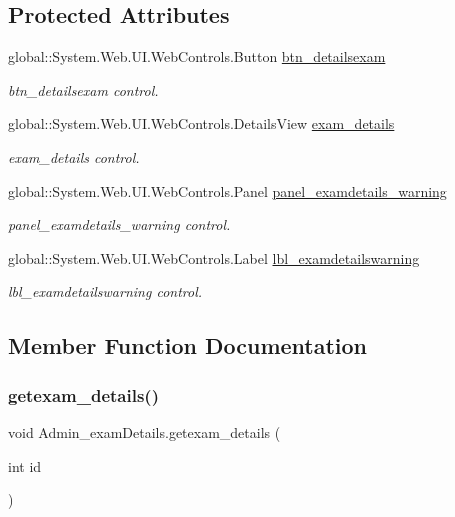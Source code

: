 \subsection*{Protected Attributes}
\begin{DoxyCompactItemize}
\item 
global\+::\+System.\+Web.\+U\+I.\+Web\+Controls.\+Button \mbox{\hyperlink{class_admin__exam_details_a3599c2b50cf49795d72693d1bfda6c34}{btn\+\_\+detailsexam}}
\begin{DoxyCompactList}\small\item\em btn\+\_\+detailsexam control. \end{DoxyCompactList}\item 
global\+::\+System.\+Web.\+U\+I.\+Web\+Controls.\+Details\+View \mbox{\hyperlink{class_admin__exam_details_afdfbbd6b753e1569ba22d7bc302a15a1}{exam\+\_\+details}}
\begin{DoxyCompactList}\small\item\em exam\+\_\+details control. \end{DoxyCompactList}\item 
global\+::\+System.\+Web.\+U\+I.\+Web\+Controls.\+Panel \mbox{\hyperlink{class_admin__exam_details_a2a02bac9537ad60dd71fabb8c5fb3756}{panel\+\_\+examdetails\+\_\+warning}}
\begin{DoxyCompactList}\small\item\em panel\+\_\+examdetails\+\_\+warning control. \end{DoxyCompactList}\item 
global\+::\+System.\+Web.\+U\+I.\+Web\+Controls.\+Label \mbox{\hyperlink{class_admin__exam_details_ace4ec1028bc3870e30b3f17ed36ac052}{lbl\+\_\+examdetailswarning}}
\begin{DoxyCompactList}\small\item\em lbl\+\_\+examdetailswarning control. \end{DoxyCompactList}\end{DoxyCompactItemize}


\subsection{Member Function Documentation}
\mbox{\label{class_admin__exam_details_a9cfbc923d62fce62b53e61ce1796c97a}} 
\subsubsection{\texorpdfstring{getexam\_details()}{getexam\_details()}}
{\footnotesize\ttfamily void Admin\+\_\+exam\+Details.\+getexam\+\_\+details (\begin{DoxyParamCaption}\item[{int}]{id }\end{DoxyParamCaption})}

